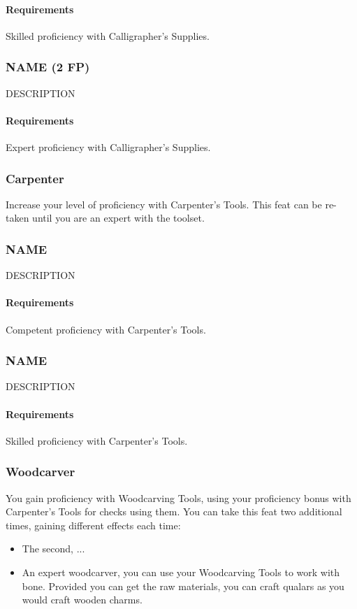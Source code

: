     \paragraph{Requirements} Skilled proficiency with Calligrapher's Supplies.
\subsubsection{NAME (2 FP)} \label{feat::name}
    DESCRIPTION
    \paragraph{Requirements} Expert proficiency with Calligrapher's Supplies.
\subsubsection{Carpenter} \label{feat::carpenter}
    Increase your level of proficiency with Carpenter's Tools.
    This feat can be re-taken until you are an expert with the toolset.
\subsubsection{NAME} \label{feat::name}
    DESCRIPTION
    \paragraph{Requirements} Competent proficiency with Carpenter's Tools.
\subsubsection{NAME} \label{feat::name}
    DESCRIPTION
    \paragraph{Requirements} Skilled proficiency with Carpenter's Tools.
\subsubsection{Woodcarver} \label{feat::woodcarver}
    You gain proficiency with Woodcarving Tools, using your proficiency bonus with Carpenter's Tools for checks using them.
    You can take this feat two additional times, gaining different effects each time:
    \begin{itemize}
        \item The second, ...
        \item An expert woodcarver, you can use your Woodcarving Tools to work with bone.
        Provided you can get the raw materials, you can craft qualars as you would craft wooden charms.
    \end{itemize}

